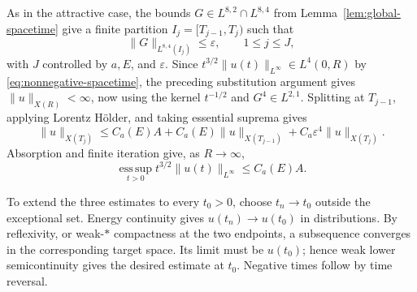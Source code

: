 \documentclass[preprint,12pt]{elsarticle}
\numberwithin{equation}{section}
\theoremstyle{definition}
\theoremstyle{remark}
\newcommand{\norm}[2]{\lVert #1\rVert_{#2}}
\newcommand{\eps}{\varepsilon}
\begin{document}
As in the attractive case, the bounds $G\in L^{8,2}\cap L^{8,4}$
from Lemma~\ref{lem:global-spacetime} give a finite partition
$I_j=[T_{j-1},T_j)$ such that
\[
 \norm{G}{L^{8,4}(I_j)}\leq\eps,
 \qquad 1\leq j\leq J,
\]
with $J$ controlled by $a,E$, and $\eps$. Since
$t^{3/2}\norm{u(t)}{L^\infty}\in L^4(0,R)$ by
\eqref{eq:nonnegative-spacetime}, the preceding substitution
argument gives $\norm{u}{X(R)}<\infty$, now using the kernel
$t^{-1/2}$ and $G^4\in L^{2,1}$. Splitting at $T_{j-1}$, applying
Lorentz H\"older, and taking essential suprema gives
\[
 \norm{u}{X(T_j)}
 \leq C_a(E)A+C_a(E)\norm{u}{X(T_{j-1})}
 +C_a\eps^4\norm{u}{X(T_j)}.
\]
Absorption and finite iteration give, as $R\to\infty$,
\[
 \operatorname*{ess\,sup}_{t>0}
 t^{3/2}\norm{u(t)}{L^\infty}\leq C_a(E)A.
\]


To extend the three estimates to every $t_0>0$, choose
$t_n\to t_0$ outside the exceptional set.  Energy continuity gives
$u(t_n)\to u(t_0)$ in distributions.  By reflexivity, or weak-$*$
compactness at the two endpoints, a subsequence converges in the
corresponding target space.  Its limit must be $u(t_0)$; hence weak lower
semicontinuity gives the desired estimate at $t_0$.  Negative times follow
by time reversal. 
\end{document}
